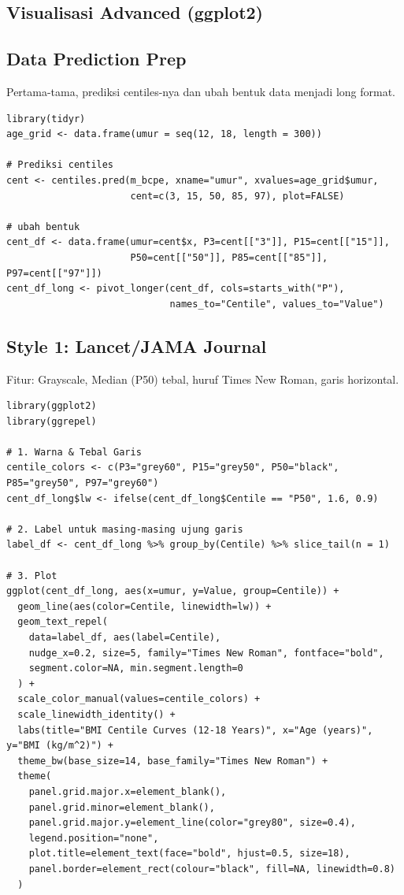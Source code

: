 \documentclass[11pt, a4paper]{article}
\begin{document}
\begin{enumerate}
\section{Visualisasi Advanced (ggplot2)}

\subsection{Data Prediction Prep}
Pertama-tama, prediksi centiles-nya dan ubah bentuk data menjadi long format.
\begin{lstlisting}
library(tidyr)
age_grid <- data.frame(umur = seq(12, 18, length = 300))

# Prediksi centiles
cent <- centiles.pred(m_bcpe, xname="umur", xvalues=age_grid$umur, 
                      cent=c(3, 15, 50, 85, 97), plot=FALSE)

# ubah bentuk
cent_df <- data.frame(umur=cent$x, P3=cent[["3"]], P15=cent[["15"]], 
                      P50=cent[["50"]], P85=cent[["85"]], P97=cent[["97"]])
cent_df_long <- pivot_longer(cent_df, cols=starts_with("P"), 
                             names_to="Centile", values_to="Value")
\end{lstlisting}

\subsection{Style 1: Lancet/JAMA Journal}
Fitur: Grayscale, Median (P50) tebal, huruf Times New Roman, garis horizontal.

\begin{lstlisting}
library(ggplot2)
library(ggrepel)

# 1. Warna & Tebal Garis
centile_colors <- c(P3="grey60", P15="grey50", P50="black", P85="grey50", P97="grey60")
cent_df_long$lw <- ifelse(cent_df_long$Centile == "P50", 1.6, 0.9)

# 2. Label untuk masing-masing ujung garis 
label_df <- cent_df_long %>% group_by(Centile) %>% slice_tail(n = 1)

# 3. Plot
ggplot(cent_df_long, aes(x=umur, y=Value, group=Centile)) +
  geom_line(aes(color=Centile, linewidth=lw)) +
  geom_text_repel(
    data=label_df, aes(label=Centile),
    nudge_x=0.2, size=5, family="Times New Roman", fontface="bold",
    segment.color=NA, min.segment.length=0
  ) +
  scale_color_manual(values=centile_colors) +
  scale_linewidth_identity() +
  labs(title="BMI Centile Curves (12-18 Years)", x="Age (years)", y="BMI (kg/m^2)") +
  theme_bw(base_size=14, base_family="Times New Roman") +
  theme(
    panel.grid.major.x=element_blank(),
    panel.grid.minor=element_blank(),
    panel.grid.major.y=element_line(color="grey80", size=0.4),
    legend.position="none",
    plot.title=element_text(face="bold", hjust=0.5, size=18),
    panel.border=element_rect(colour="black", fill=NA, linewidth=0.8)
  )
\end{lstlisting}


\end{enumerate}
\end{document}
